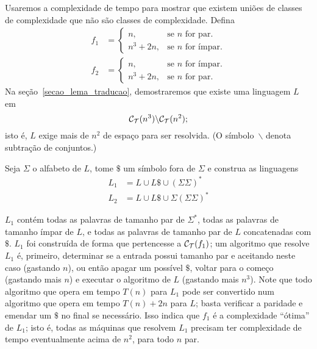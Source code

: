 \begin{counterexample}
    Usaremos a complexidade de tempo para mostrar que
    existem uniões de classes de complexidade
    que não são classes de complexidade.
    Defina
    \begin{align*}
        f_1 & = \begin{cases}
                    n, & \text{se $n$ for par.} \\
                    n^3 + 2n, & \text{se $n$ for ímpar.}
                \end{cases} \\
        f_2 & = \begin{cases}
                    n, & \text{se $n$ for ímpar.} \\
                    n^3 + 2n, & \text{se $n$ for par.}
                \end{cases}
    \end{align*}
    Na seção~\ref{secao_lema_traducao},
    demostraremos que existe uma linguagem $L$ em
    \begin{equation*}
        \mathcal C_{\mathcal{T}}(n^3) \backslash \mathcal C_{\mathcal{T}}(n^2);
    \end{equation*}
    isto é, $L$ exige mais de $n^2$ de espaço para ser resolvida.
    (O símbolo~$\backslash$ denota subtração de conjuntos.)

    Seja $\Sigma$ o alfabeto de $L$,
    tome $\$$ um símbolo fora de $\Sigma$
    e construa as linguagens
    \begin{align*}
        L_1 &= L \cup L\$ \cup ( \Sigma \Sigma )^* \\
        L_2 &= L \cup L\$ \cup \Sigma ( \Sigma \Sigma )^*
    \end{align*}

    $L_1$ contém todas as palavras de tamanho par de $\Sigma^*$,
    todas as palavras de tamanho ímpar de $L$,
    e todas as palavras de tamanho par de $L$ concatenadas com $\$$.
    $L_1$ foi construída de forma que pertencesse
    a $\mathcal C_{\mathcal{T}}(f_1)$;
    um algoritmo que resolve $L_1$
    é, primeiro, determinar se a entrada possui tamanho par
    e aceitando neste caso
    (gastando $n$),
    ou então apagar um possível $\$$,
    voltar para o começo
    (gastando mais $n$)
    e executar o algoritmo de $L$
    (gastando mais $n^3$).
    Note que todo algoritmo que opera em tempo $T(n)$
    para $L_1$
    pode ser convertido num algoritmo que opera em tempo
    $T(n) + 2n$ para $L$;
    basta verificar a paridade e emendar um $\$$ no final
    se necessário.
    Isso indica que $f_1$ é a complexidade ``ótima''
    de $L_1$;
    isto é,
    todas as máquinas que resolvem $L_1$
    precisam ter complexidade de tempo
    eventualmente acima de $n^2$,
    para todo $n$ par.


\end{counterexample}
